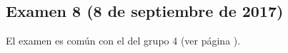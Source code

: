 \documentclass[a4paper,12pt,twoside]{book}
\begin{document}
\subsection{Examen 8 (8 de septiembre de 2017)}
El examen es común con el del grupo 4 (ver página \pageref{examen_16_16_4_8}).

\appendix %






\nocite{Alonso-12b}
\nocite{Bird-99a}
\nocite{Cunningham-10a}
\nocite{Daume-06}
\nocite{Davie-92a}
\nocite{Doets-04a}
\nocite{Fokker-96}
\nocite{Hudak-00a}
\nocite{Hudak-12a}
\nocite{Hutton-07a}
\nocite{OSullivan-08a}
\nocite{Rabhi-99a}
\nocite{Polya-65a}
\nocite{Ruiz-04}
\nocite{Thompson-11a}



\end{document}
